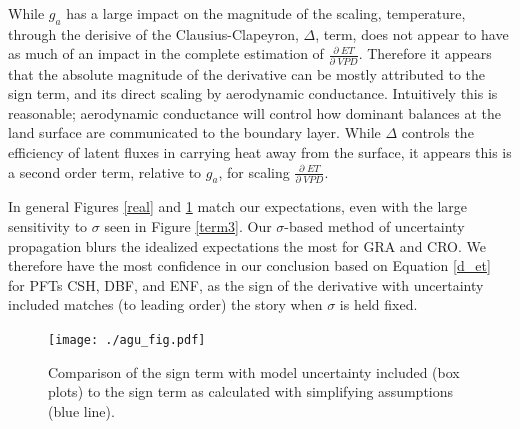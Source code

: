 \documentclass[draft,linenumbers]{agujournal}
\begin{document}
While $g_a$ has a large impact on the magnitude of the scaling, temperature, through the derisive of the Clausius-Clapeyron, $\Delta$, term, does not appear to have as much of an impact in the complete estimation of $\frac{\partial \; ET}{\partial \; VPD}$. Therefore it appears that the absolute magnitude of the derivative can be mostly attributed to the sign term, and its direct scaling by aerodynamic conductance. Intuitively this is reasonable; aerodynamic conductance will control how dominant balances at the land surface are communicated to the boundary layer. While $\Delta$ controls the efficiency of latent fluxes in carrying heat away from the surface, it appears this is a second order term, relative to $g_a$, for scaling $\frac{\partial \; ET}{\partial \; VPD}$. 

In general Figures \ref{real} and \ref{agu_fig} match our expectations, even with the large sensitivity to $\sigma$ seen in Figure \ref{term3}. Our $\sigma$-based method of uncertainty propagation blurs the idealized expectations the most for GRA and CRO. We therefore have the most confidence in our conclusion based on Equation \ref{d_et} for PFTs CSH, DBF, and ENF, as the sign of the derivative with uncertainty included matches (to leading order) the story when $\sigma$ is held fixed.

\begin{figure}[h]
\centering
\texttt{[image: ./agu\_fig.pdf]}
\caption{Comparison of the sign term with model uncertainty included (box plots) to the sign term as calculated with simplifying assumptions (blue line).}
\label{agu_fig}
\end{figure}
\end{document}
